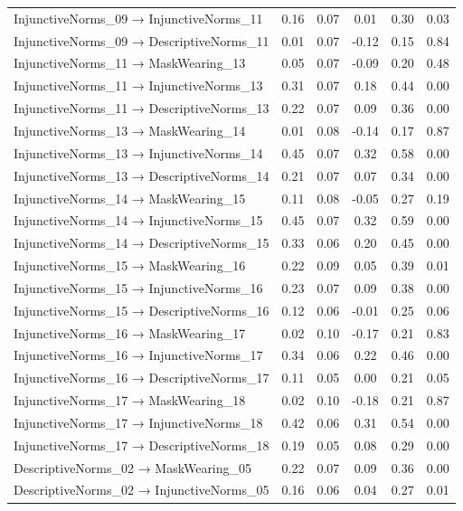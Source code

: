 \documentclass[
  man, donotrepeattitle,floatsintext]{apa6}
\begin{document}
\begin{center}
\begin{ThreePartTable}
{\begin{longtable}{lccccc}
InjunctiveNorms\_09 → InjunctiveNorms\_11 & 0.16 & 0.07 & 0.01 & 0.30 & 0.03\\
InjunctiveNorms\_09 → DescriptiveNorms\_11 & 0.01 & 0.07 & -0.12 & 0.15 & 0.84\\
InjunctiveNorms\_11 → MaskWearing\_13 & 0.05 & 0.07 & -0.09 & 0.20 & 0.48\\
InjunctiveNorms\_11 → InjunctiveNorms\_13 & 0.31 & 0.07 & 0.18 & 0.44 & 0.00\\
InjunctiveNorms\_11 → DescriptiveNorms\_13 & 0.22 & 0.07 & 0.09 & 0.36 & 0.00\\
InjunctiveNorms\_13 → MaskWearing\_14 & 0.01 & 0.08 & -0.14 & 0.17 & 0.87\\
InjunctiveNorms\_13 → InjunctiveNorms\_14 & 0.45 & 0.07 & 0.32 & 0.58 & 0.00\\
InjunctiveNorms\_13 → DescriptiveNorms\_14 & 0.21 & 0.07 & 0.07 & 0.34 & 0.00\\
InjunctiveNorms\_14 → MaskWearing\_15 & 0.11 & 0.08 & -0.05 & 0.27 & 0.19\\
InjunctiveNorms\_14 → InjunctiveNorms\_15 & 0.45 & 0.07 & 0.32 & 0.59 & 0.00\\
InjunctiveNorms\_14 → DescriptiveNorms\_15 & 0.33 & 0.06 & 0.20 & 0.45 & 0.00\\
InjunctiveNorms\_15 → MaskWearing\_16 & 0.22 & 0.09 & 0.05 & 0.39 & 0.01\\
InjunctiveNorms\_15 → InjunctiveNorms\_16 & 0.23 & 0.07 & 0.09 & 0.38 & 0.00\\
InjunctiveNorms\_15 → DescriptiveNorms\_16 & 0.12 & 0.06 & -0.01 & 0.25 & 0.06\\
InjunctiveNorms\_16 → MaskWearing\_17 & 0.02 & 0.10 & -0.17 & 0.21 & 0.83\\
InjunctiveNorms\_16 → InjunctiveNorms\_17 & 0.34 & 0.06 & 0.22 & 0.46 & 0.00\\
InjunctiveNorms\_16 → DescriptiveNorms\_17 & 0.11 & 0.05 & 0.00 & 0.21 & 0.05\\
InjunctiveNorms\_17 → MaskWearing\_18 & 0.02 & 0.10 & -0.18 & 0.21 & 0.87\\
InjunctiveNorms\_17 → InjunctiveNorms\_18 & 0.42 & 0.06 & 0.31 & 0.54 & 0.00\\
InjunctiveNorms\_17 → DescriptiveNorms\_18 & 0.19 & 0.05 & 0.08 & 0.29 & 0.00\\
DescriptiveNorms\_02 → MaskWearing\_05 & 0.22 & 0.07 & 0.09 & 0.36 & 0.00\\
DescriptiveNorms\_02 → InjunctiveNorms\_05 & 0.16 & 0.06 & 0.04 & 0.27 & 0.01\\

\end{longtable}}
\end{ThreePartTable}
\end{center}
\end{document}
